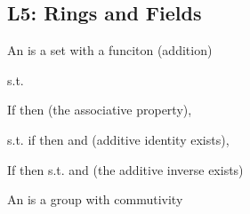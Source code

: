 \subsection{L5: Rings and Fields}
\begin{D} An  is a set  with a funciton (addition) \begin{compactitem}
\item {}
\item {}
\end{compactitem} s.t.
\begin{compactitem} 
\item If  then  (the associative property),
\item {} s.t. if  then  and  (additive identity exists),
\item If  then  s.t.  and  (the additive inverse exists)
\end{compactitem}
\end{D}

\begin{D} An  is a group with commutivity \end{D}

